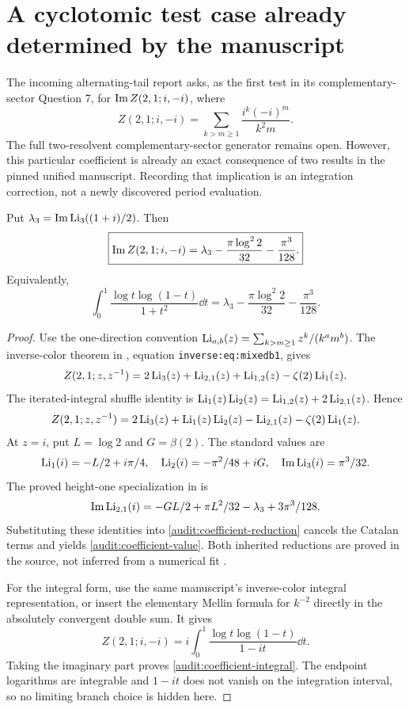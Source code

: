 \section{A cyclotomic test case already determined by the manuscript}
\label{audit:cyclo}

The incoming alternating-tail report asks, as the first test in its
complementary-sector Question 7, for
$\operatorname{Im} Z(2,1;i,-i)$, where
\[
 Z(2,1;i,-i)=\sum_{k>m\ge1}\frac{i^k(-i)^m}{k^2m}.
\]
The full two-resolvent complementary-sector generator remains open.
However, this particular coefficient is already an exact consequence of
two results in the pinned unified manuscript. Recording that implication
is an integration correction, not a newly discovered period evaluation.

\begin{proposition}\label{audit:coefficient}
Put $\lambda_3=\operatorname{Im}\operatorname{Li}_3((1+i)/2)$. Then
\begin{equation}\label{audit:coefficient-value}
 \boxed{\displaystyle
 \operatorname{Im} Z(2,1;i,-i)
   =\lambda_3-\frac{\pi\log^2 2}{32}-\frac{\pi^3}{128}.}
\end{equation}
Equivalently,
\begin{equation}\label{audit:coefficient-integral}
 \int_0^1\frac{\log t\log(1-t)}{1+t^2}\dd t
 =\lambda_3-\frac{\pi\log^2 2}{32}-\frac{\pi^3}{128}.
\end{equation}
\end{proposition}
\begin{proof}
Use the one-direction convention
$\operatorname{Li}_{a,b}(z)=\sum_{k>m\ge1}z^k/(k^a m^b)$.
The inverse-color theorem in
, equation
\texttt{inverse:eq:mixedb1}, gives
\[
 Z(2,1;z,z^{-1})
 =2\operatorname{Li}_3(z)+\operatorname{Li}_{2,1}(z)+\operatorname{Li}_{1,2}(z)-\zeta(2)\operatorname{Li}_1(z).
\]
The iterated-integral shuffle identity is
$\operatorname{Li}_1(z)\operatorname{Li}_2(z)=\operatorname{Li}_{1,2}(z)+2\operatorname{Li}_{2,1}(z)$.
Hence
\begin{equation}\label{audit:coefficient-reduction}
 Z(2,1;z,z^{-1})
 =2\operatorname{Li}_3(z)+\operatorname{Li}_1(z)\operatorname{Li}_2(z)-\operatorname{Li}_{2,1}(z)-\zeta(2)\operatorname{Li}_1(z).
\end{equation}
At $z=i$, put $L=\log2$ and $G=\beta(2)$. The standard values are
\[
 \operatorname{Li}_1(i)=-L/2+i\pi/4,\quad
 \operatorname{Li}_2(i)=-\pi^2/48+iG,\quad
 \operatorname{Im}\operatorname{Li}_3(i)=\pi^3/32.
\]
The proved height-one specialization in
 is
\[
 \operatorname{Im}\operatorname{Li}_{2,1}(i)
 =-GL/2+\pi L^2/32-\lambda_3+3\pi^3/128.
\]
Substituting these identities into
\eqref{audit:coefficient-reduction} cancels the Catalan terms and yields
\eqref{audit:coefficient-value}. Both inherited reductions are proved in
the source, not inferred from a numerical fit \cite{ProveItPin}.

For the integral form, use the same manuscript's inverse-color integral
representation, or insert the elementary Mellin formula for $k^{-2}$
directly in the absolutely convergent double sum. It gives
\[
 Z(2,1;i,-i)
 =i\int_0^1\frac{\log t\log(1-t)}{1-it}\dd t.
\]
Taking the imaginary part proves \eqref{audit:coefficient-integral}.
The endpoint logarithms are integrable and $1-it$ does not vanish on the
integration interval, so no limiting branch choice is hidden here.
\end{proof}

